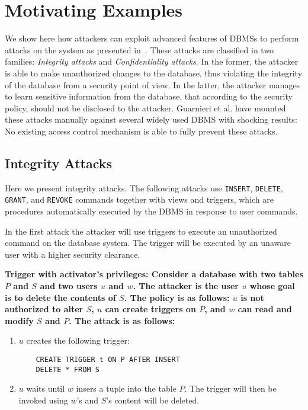 \section{Motivating Examples}

We show here how attackers can exploit advanced features of DBMSs to perform attacks on the system as presented in~\cite{guarnieri2016strong}.
%
These attacks are classified in two families: \emph{Integrity attacks} and \emph{Confidentiality attacks}.
%
In the former, the attacker is able to make unauthorized changes to the database, thus violating the integrity of the database from a security point of view.
%
In the latter, the attacker manages to learn sensitive information from the database, that according to the security policy, should not be disclosed to the attacker.
%
Guarnieri et al. have mounted these attacks manually against several widely used DBMS with shocking results: No existing access control mechanism is able to fully prevent these attacks.

\subsection{Integrity Attacks}

Here we present integrity attacks. 
%
The following attacks use \texttt{INSERT}, \texttt{DELETE}, \texttt{GRANT}, and \texttt{REVOKE} commands together with views and triggers, which are procedures automatically executed by the DBMS in response to user commands.

In the first attack the attacker will use triggers to execute an unauthorized command on the database system. The trigger will be executed by an unaware user with a higher security clearance.

\begin{attack}
\bf{Trigger with activator's privileges:}
Consider a database with two tables $P$ and $S$ and two users $u$ and $w$. The attacker is the user $u$ whose goal is to delete the contents of $S$. The policy is as follows: $u$ is not authorized to alter $S$, $u$ can create triggers on $P$, and $w$ can read and modify $S$ and $P$. The attack is as follows:
\begin{enumerate}
\item $u$ creates the following trigger:
	\begin{verbatim}
	CREATE TRIGGER t ON P AFTER INSERT
    DELETE * FROM S
	\end{verbatim}
\item $u$ waits until $w$ insers a tuple into the table $P$. The trigger will then be invoked using $w$'s and $S$'s content will be deleted.
\end{enumerate}
\end{attack}

